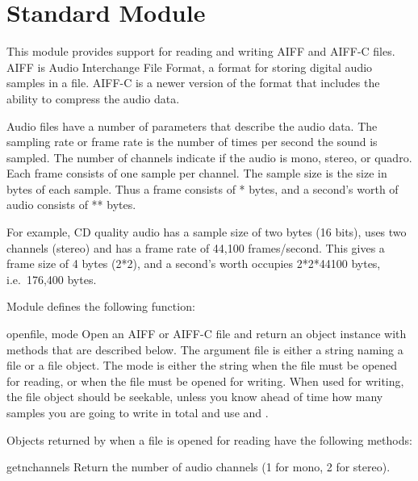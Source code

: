 \section{Standard Module }
\label{module-aifc}

This module provides support for reading and writing AIFF and AIFF-C
files.  AIFF is Audio Interchange File Format, a format for storing
digital audio samples in a file.  AIFF-C is a newer version of the
format that includes the ability to compress the audio data.

Audio files have a number of parameters that describe the audio data.
The sampling rate or frame rate is the number of times per second the
sound is sampled.  The number of channels indicate if the audio is
mono, stereo, or quadro.  Each frame consists of one sample per
channel.  The sample size is the size in bytes of each sample.  Thus a
frame consists of * bytes, and a
second's worth of audio consists of
** bytes.

For example, CD quality audio has a sample size of two bytes (16
bits), uses two channels (stereo) and has a frame rate of 44,100
frames/second.  This gives a frame size of 4 bytes (2*2), and a
second's worth occupies 2*2*44100 bytes, i.e.\ 176,400 bytes.

Module  defines the following function:

\begin{funcdesc}{open}{file, mode}
Open an AIFF or AIFF-C file and return an object instance with
methods that are described below.  The argument file is either a
string naming a file or a file object.  The mode is either the string
 when the file must be opened for reading, or 
when the file must be opened for writing.  When used for writing, the
file object should be seekable, unless you know ahead of time how many
samples you are going to write in total and use
 and .
\end{funcdesc}

Objects returned by  when a file is opened for
reading have the following methods:

\begin{methoddesc}[aifc]{getnchannels}{}
Return the number of audio channels (1 for mono, 2 for stereo).
\end{methoddesc}

